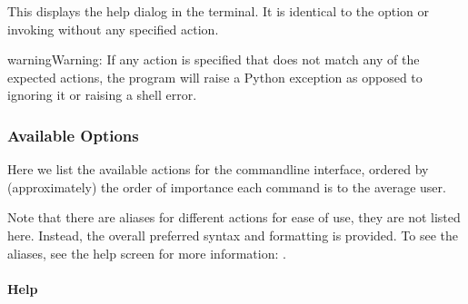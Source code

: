 \documentclass[letterpaper,11pt,english]{sphinxmanual}
\begin{document}
\sphinxAtStartPar
This displays the help dialog in the terminal. It is identical to the
{\hyperref[\detokenize{user/command_line:cmdoption-help}]{}} option or invoking  without any
specified action.

\begin{sphinxadmonition}{warning}{Warning:}
\sphinxAtStartPar
If any action is specified that does not match any of the expected actions,
the program will raise a Python exception as opposed to ignoring it or
raising a shell error.
\end{sphinxadmonition}


\subsubsection{Available Options}
\label{\detokenize{user/command_line:available-options}}\label{\detokenize{user/command_line:user-command-line-available-options}}

\begin{savenotes}\begin{fulllineitems}
\label{\detokenize{user/command_line:cmdoption-arg-options}}
\pysigstartsignatures
\pysigline{\sphinxbfcode{\sphinxupquote{{[}options{]}}}\sphinxcode{\sphinxupquote{}}}
\pysigstopsignatures
\end{fulllineitems}\end{savenotes}


\sphinxAtStartPar
Here we list the available actions for the command\sphinxhyphen{}line interface, ordered by
(approximately) the order of importance each command is to the average user.

\sphinxAtStartPar
Note that there are aliases for different actions for ease of use, they
are not listed here. Instead, the overall preferred syntax and formatting
is provided. To see the aliases, see the help screen for more information:
{\hyperref[\detokenize{user/command_line:user-command-line-available-actions-help}]{}}.


\paragraph{Help}
\label{\detokenize{user/command_line:id1}}
\end{document}
